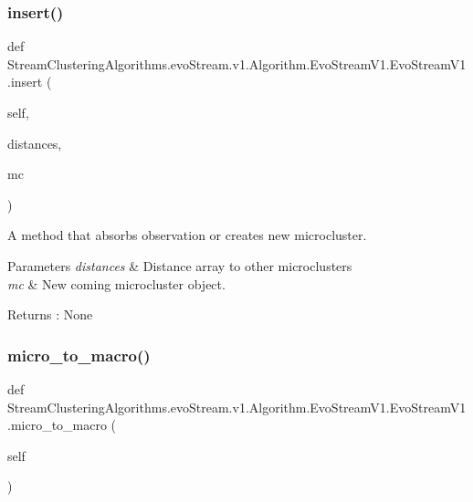\subsubsection{\texorpdfstring{insert()}{insert()}}
{\footnotesize\ttfamily def Stream\+Clustering\+Algorithms.\+evo\+Stream.\+v1.\+Algorithm.\+Evo\+Stream\+V1.\+Evo\+Stream\+V1.\+insert (\begin{DoxyParamCaption}\item[{}]{self,  }\item[{}]{distances,  }\item[{}]{mc }\end{DoxyParamCaption})}



A method that absorbs observation or creates new microcluster. 


\begin{DoxyParams}{Parameters}
{\em distances} & Distance array to other microclusters \\
\hline
{\em mc} & New coming microcluster object. \\
\hline
\end{DoxyParams}
\begin{DoxyReturn}{Returns}
\+: None 
\end{DoxyReturn}
\mbox{\label{classStreamClusteringAlgorithms_1_1evoStream_1_1v1_1_1Algorithm_1_1EvoStreamV1_1_1EvoStreamV1_a649bb433a054250b3851a8a966fe8a7d}} 
\subsubsection{\texorpdfstring{micro\+\_\+to\+\_\+macro()}{micro\_to\_macro()}}
{\footnotesize\ttfamily def Stream\+Clustering\+Algorithms.\+evo\+Stream.\+v1.\+Algorithm.\+Evo\+Stream\+V1.\+Evo\+Stream\+V1.\+micro\+\_\+to\+\_\+macro (\begin{DoxyParamCaption}\item[{}]{self }\end{DoxyParamCaption})}

